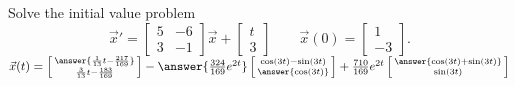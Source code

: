 \documentclass{ximera}
\begin{document}
\begin{exercise}
Solve the initial value problem
\[ 
    {\vec{x}}' = 
    \begin{bmatrix} 
        5 & -6 \\ 
        3 & -1 
    \end{bmatrix}
    \vec{x} + 
    \begin{bmatrix} 
        t \\ 
        3 
    \end{bmatrix} 
    \qquad \vec{x}(0) = 
    \begin{bmatrix} 
        1 \\ 
        -3 
    \end{bmatrix}. 
\]
$\vec{x}(t) = \left[\begin{smallmatrix} \answer{\frac{1}{13}t - \frac{217}{169}} \\ \frac{3}{13}t - \frac{183}{169} \end{smallmatrix}\right] - \answer{\frac{324}{169} e^{2t}}\left[\begin{smallmatrix} \cos(3t) - \sin(3t) \\ \answer{\cos(3t)} \end{smallmatrix}\right] + \frac{710}{169}e^{2t}\left[\begin{smallmatrix} \answer{\cos(3t) + \sin(3t)} \\ \sin(3t) \end{smallmatrix}\right]$
\end{exercise}
\end{document}
